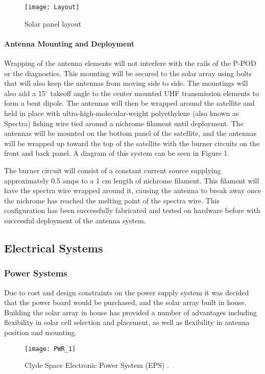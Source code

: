 \documentclass[nocover]            %
{CSLI}                       %
\begin{document}
\begin{figure}[H]

    \texttt{[image: Layout]}
    \caption{Solar panel layout}
\end{figure}

\paragraph{Antenna Mounting and Deployment\\}
Wrapping of the antenna elements will not interfere with the rails of the P-POD or the diagnostics. This mounting will be secured to the solar array using bolts that will also keep the antennas from moving side to side. The mountings will also add a 15$^\circ$ takeoff angle to the center mounted UHF transmission elements to form a bent dipole. The antennas will then be wrapped around the satellite and held in place with ultra-high-molecular-weight polyethylene (also known as Spectra) fishing wire tied around a nichrome filament until deployment. The antennas will be mounted on the bottom panel of the satellite, and the antennas will be wrapped up toward the top of the satellite with the burner circuits on the front and back panel. A diagram of this system can be seen in Figure 1. 
 
The burner circuit will consist of a constant current source supplying approximately 0.5 amps to a 1 cm length of nichrome filament. This filament will have the spectra wire wrapped around it, causing the antenna to break away once the nichrome has reached the melting point of the spectra wire. This configuration has been successfully fabricated and tested on hardware before with successful deployment of the antenna system.
 
\subsection{Electrical Systems}
\subsubsection{Power Systems}
Due to cost and design constraints on the power supply system it was decided that the power board would be purchased, and the solar array built in house. Building the solar array in house has provided a number of advantages including flexibility in solar cell selection and placement, as well as flexibility in antenna position and mounting.


\begin{figure}[H]
\centering
    \texttt{[image: PWR\_1]}
    \caption{Clyde Space Electronic Power System (EPS) \cite{Clyde Space}.}
\end{figure}
\end{document}
